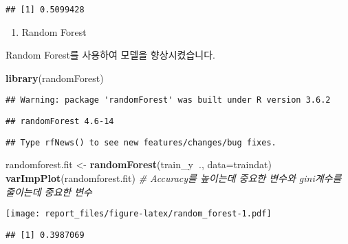 \documentclass[]{article}
\newenvironment{Shaded}{\begin{snugshade}}{\end{snugshade}}
\newcommand{\CommentTok}[1]{\textcolor[rgb]{0.56,0.35,0.01}{\textit{#1}}}
\newcommand{\DataTypeTok}[1]{\textcolor[rgb]{0.13,0.29,0.53}{#1}}
\newcommand{\DecValTok}[1]{\textcolor[rgb]{0.00,0.00,0.81}{#1}}
\newcommand{\KeywordTok}[1]{\textcolor[rgb]{0.13,0.29,0.53}{\textbf{#1}}}
\newcommand{\NormalTok}[1]{#1}
\newcommand{\OperatorTok}[1]{\textcolor[rgb]{0.81,0.36,0.00}{\textbf{#1}}}
\newcommand{\StringTok}[1]{\textcolor[rgb]{0.31,0.60,0.02}{#1}}
\providecommand{\tightlist}{%
  \setlength{\itemsep}{0pt}\setlength{\parskip}{0pt}}
\begin{document}
\begin{verbatim}
## [1] 0.5099428
\end{verbatim}

\begin{enumerate}
\def\labelenumi{\arabic{enumi})}
\setcounter{enumi}{2}
\tightlist
\item
  Random Forest
\end{enumerate}

Random Forest를 사용하여 모델을 향상시켰습니다.

\begin{Shaded}
\begin{Highlighting}[]
\KeywordTok{library}\NormalTok{(randomForest)}
\end{Highlighting}
\end{Shaded}

\begin{verbatim}
## Warning: package 'randomForest' was built under R version 3.6.2
\end{verbatim}

\begin{verbatim}
## randomForest 4.6-14
\end{verbatim}

\begin{verbatim}
## Type rfNews() to see new features/changes/bug fixes.
\end{verbatim}

\begin{Shaded}
\begin{Highlighting}[]
\NormalTok{randomforest.fit <-}\StringTok{ }\KeywordTok{randomForest}\NormalTok{(train_y}\OperatorTok{~}\NormalTok{., }\DataTypeTok{data=}\NormalTok{traindat)}
\KeywordTok{varImpPlot}\NormalTok{(randomforest.fit) }\CommentTok{# Accuracy를 높이는데 중요한 변수와 gini계수를 줄이는데 중요한 변수}
\end{Highlighting}
\end{Shaded}

\texttt{[image: report\_files/figure-latex/random\_forest-1.pdf]}

\begin{Shaded}
\end{Shaded}

\begin{verbatim}
## [1] 0.3987069
\end{verbatim}
\end{document}
